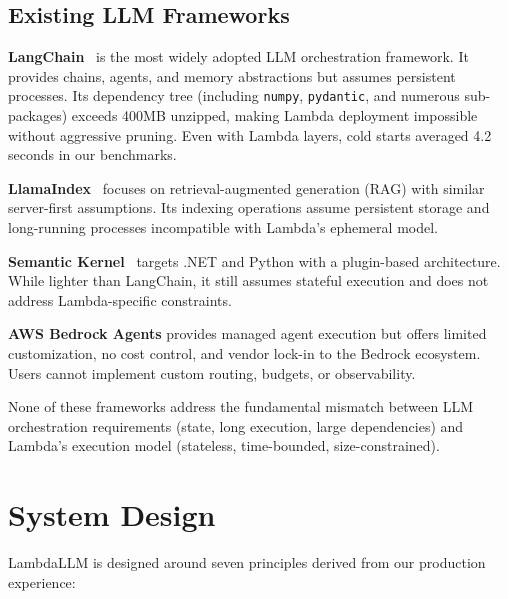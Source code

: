 \documentclass[10pt,twocolumn,letterpaper]{article}
\begin{document}
\subsection{Existing LLM Frameworks}

\textbf{LangChain}~\cite{langchain} is the most widely adopted LLM orchestration framework. It provides chains, agents, and memory abstractions but assumes persistent processes. Its dependency tree (including \texttt{numpy}, \texttt{pydantic}, and numerous sub-packages) exceeds 400MB unzipped, making Lambda deployment impossible without aggressive pruning. Even with Lambda layers, cold starts averaged 4.2 seconds in our benchmarks.

\textbf{LlamaIndex}~\cite{llamaindex} focuses on retrieval-augmented generation (RAG) with similar server-first assumptions. Its indexing operations assume persistent storage and long-running processes incompatible with Lambda's ephemeral model.

\textbf{Semantic Kernel}~\cite{semantickernel} targets .NET and Python with a plugin-based architecture. While lighter than LangChain, it still assumes stateful execution and does not address Lambda-specific constraints.

\textbf{AWS Bedrock Agents} provides managed agent execution but offers limited customization, no cost control, and vendor lock-in to the Bedrock ecosystem. Users cannot implement custom routing, budgets, or observability.

None of these frameworks address the fundamental mismatch between LLM orchestration requirements (state, long execution, large dependencies) and Lambda's execution model (stateless, time-bounded, size-constrained).

\section{System Design}

LambdaLLM is designed around seven principles derived from our production experience:
\end{document}
